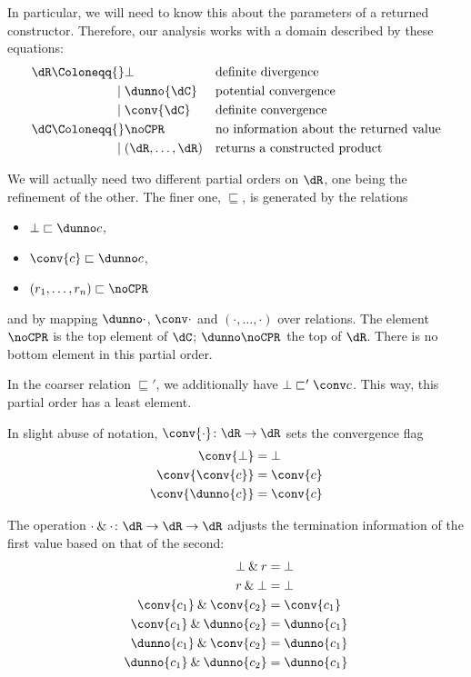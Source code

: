 \documentclass[parskip=half]{scrartcl}
\newcommand{\both}[2]{#1\mathbin{\&}#2}
\begin{document}
In particular, we will need to know this about the parameters of a returned constructor. Therefore, our analysis works with a domain described by these equations:
\begin{align*}
\dR \Coloneqq{} & \bot && \text{definite divergence}\\
\mid{} &\dunno{\dC} && \text{potential convergence}\\
\mid{} &\conv{\dC} && \text{definite convergence}\\
\dC \Coloneqq{} & \noCPR && \text{no information about the returned value} \\
\mid{} & (\dR,\ldots, \dR) && \text{returns a constructed product}
\end{align*}

We will actually need two different partial orders on $\dR$, one being the refinement of the other. The finer one, $\sqsubseteq$, is generated by the relations
\begin{itemize}
\item $\bot \sqsubset \dunno c$,
\item $\conv{c} \sqsubset \dunno c$,
\item $(r_1,\ldots, r_n) \sqsubset \noCPR$
\end{itemize}
and by mapping $\dunno\cdot$, $\conv\cdot$ and $(\cdot,\ldots,\cdot)$ over relations. The element $\noCPR$ is the top element of $\dC$; $\dunno\noCPR$ the top of $\dR$. There is no bottom element in this partial order.

In the coarser relation $\sqsubseteq'$, we additionally have $\bot \sqsubset' \conv c$. This way, this partial order has a least element.

In slight abuse of notation, $\conv{\cdot} \colon \dR \to\dR$ sets the convergence flag
\begin{align*}
\conv{\bot} &= \bot \\
\conv{\conv{c}} &= \conv{c} \\
\conv{\dunno{c}} &= \conv{c}
\end{align*}

The operation $\both{\cdot}{\cdot} \colon \dR \to \dR \to \dR$ adjusts the termination information of the first value based on that of the second:
\begin{align*}
\both{\bot}r &= \bot \\
\both r{\bot} &= \bot \\
\both{\conv{c_1}}{\conv{c_2}} &= \conv{c_1} \\
\both{\conv{c_1}}{\dunno{c_2}} &= \dunno{c_1} \\
\both{\dunno{c_1}}{\conv{c_2}} &= \dunno{c_1} \\
\both{\dunno{c_1}}{\dunno{c_2}} &= \dunno{c_1}
\end{align*}
\end{document}
